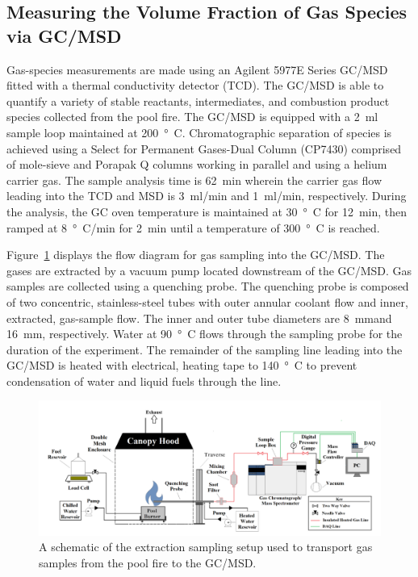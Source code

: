 \documentclass[12pt]{article}
\begin{document}
\subsection{Measuring the Volume Fraction of Gas Species via GC/MSD}
\label{ssec:Gas_Species_Setup}

Gas-species measurements are made using an Agilent 5977E Series GC/MSD fitted with a thermal conductivity detector (TCD). The GC/MSD is able to quantify a variety of stable reactants, intermediates, and combustion product species collected from the pool fire. The GC/MSD is equipped with a \SI{2}{ml} sample loop maintained at \SI{200}{\degree C}. Chromatographic separation of species is achieved using a Select for Permanent Gases-Dual Column (CP7430) comprised of mole-sieve and Porapak Q columns working in parallel and using a helium carrier gas. The sample analysis time is \SI{62}{min} wherein the carrier gas flow leading into the TCD and MSD is \SI{3}{ml/min} and \SI{1}{ml/min}, respectively. During the analysis, the GC oven temperature is maintained at \SI{30}{\degree C} for \SI{12}{min}, then ramped at \SI{8}{\degree C/min} for \SI{2}{min} until a temperature of \SI{300}{\degree C} is reached.

Figure~\ref{fig:Experimental_Setup} displays the flow diagram for gas sampling into the GC/MSD. The gases are extracted by a vacuum pump located downstream of the GC/MSD. Gas samples are collected using a quenching probe. The quenching probe is composed of two concentric, stainless-steel tubes with outer annular coolant flow and inner, extracted, gas-sample flow. The inner and outer tube diameters are \SI{8}{mm}and \SI{16}{mm}, respectively. Water at \SI{90}{\degree C} flows through the sampling probe for the duration of the experiment. The remainder of the sampling line leading into the GC/MSD is heated with electrical, heating tape to \SI{140}{\degree C} to prevent condensation of water and liquid fuels through the line.

\begin{figure}
	\centering
\includegraphics[width=\textwidth,keepaspectratio]{Experimental_Setup.png}
	\caption[A schematic of the gas sampling procedure]{A schematic of the extraction sampling setup used to transport gas samples from the pool fire to the GC/MSD.}
	\label{fig:Experimental_Setup}
\end{figure}
\end{document}
